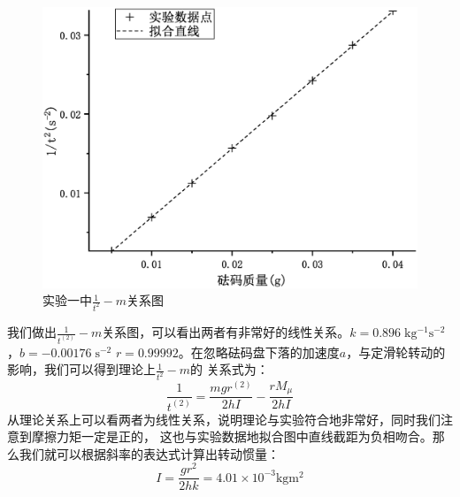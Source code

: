 \documentclass[a4paper]{ctexart}
\begin{document}
    \begin{figure}[htbp]
        \centering
        \includegraphics[scale = 0.48]{1_curve.eps}
        \caption{实验一中$\frac{1}{t^{2}}-m$关系图}
    \end{figure}
    \par 
    我们做出$\frac{1}{t^(2)}-m$关系图，可以看出两者有非常好的线性关系。$k = 0.896\;\mathrm{kg^{-1} s^{-2}}$，$b = -0.00176\;\mathrm{s^{-2}}$
    $r = 0.99992$。在忽略砝码盘下落的加速度$a$，与定滑轮转动的影响，我们可以得到理论上$\frac{1}{t^{2}}-m$的
    关系式为：
    $$
    \frac{1}{t^(2)} = \frac{mgr^(2)}{2hI} - \frac{rM_{\mu}}{2hI}
    $$
    从理论关系上可以看两者为线性关系，说明理论与实验符合地非常好，同时我们注意到摩擦力矩一定是正的，
    这也与实验数据地拟合图中直线截距为负相吻合。那么我们就可以根据斜率的表达式计算出转动惯量：
    $$
    I = \frac{gr^{2}}{2hk} = 4.01\times 10^{-3} \mathrm{kg m^{2}}
    $$
\end{document}
